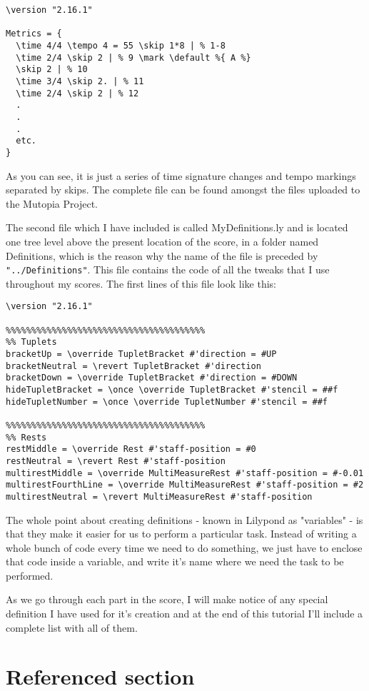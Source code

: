 \documentclass{scrreprt}
\begin{document}
\begin{verbatim}
\version "2.16.1"

Metrics = {
  \time 4/4 \tempo 4 = 55 \skip 1*8 | % 1-8
  \time 2/4 \skip 2 | % 9 \mark \default %{ A %}
  \skip 2 | % 10
  \time 3/4 \skip 2. | % 11
  \time 2/4 \skip 2 | % 12
  .
  .
  .
  etc.
}
\end{verbatim}

As you can see, it is just a series of time signature changes and tempo markings separated by skips. 
The complete file can be found amongst the files uploaded to the Mutopia Project.

The second file which I have included is called MyDefinitions.ly and is located one tree level above the present location of the score, in a folder named Definitions, which is the reason why the name of the file is preceded by \verb|"../Definitions"|.
This file contains the code of all the tweaks that I use throughout my scores. 
The first lines of this file look like this:

\begin{verbatim}
\version "2.16.1"

%%%%%%%%%%%%%%%%%%%%%%%%%%%%%%%%%%%%%%%
%% Tuplets
bracketUp = \override TupletBracket #'direction = #UP
bracketNeutral = \revert TupletBracket #'direction
bracketDown = \override TupletBracket #'direction = #DOWN
hideTupletBracket = \once \override TupletBracket #'stencil = ##f 
hideTupletNumber = \once \override TupletNumber #'stencil = ##f

%%%%%%%%%%%%%%%%%%%%%%%%%%%%%%%%%%%%%%%
%% Rests
restMiddle = \override Rest #'staff-position = #0
restNeutral = \revert Rest #'staff-position
multirestMiddle = \override MultiMeasureRest #'staff-position = #-0.01
multirestFourthLine = \override MultiMeasureRest #'staff-position = #2
multirestNeutral = \revert MultiMeasureRest #'staff-position
\end{verbatim}

The whole point about creating definitions - known in Lilypond as "variables" - is that they make it easier for us to perform a particular task.
Instead of writing a whole bunch of code every time we need to do something, we just have to enclose that code inside a variable, and write it's name where we need the task to be performed.

As we go through each part in the score, I will make notice of any special definition I have used for it's creation and at the end of this tutorial I'll include a complete list with all of them.

\pagebreak

\section{Referenced section}
\label{sec:ref_sec}
\end{document}
